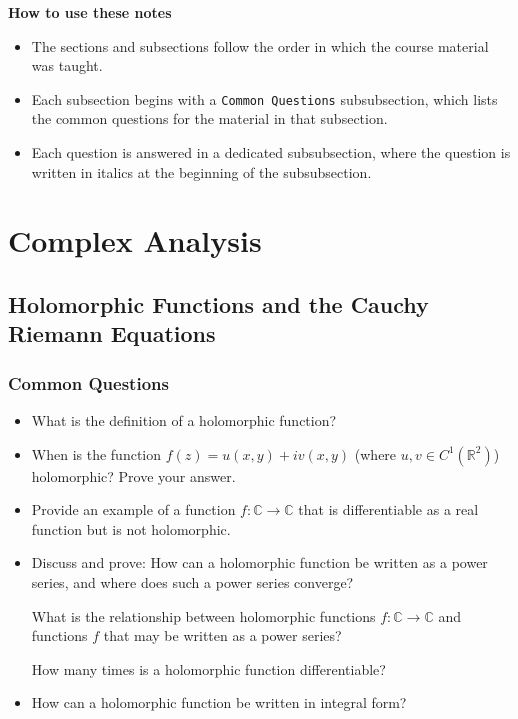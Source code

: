 \documentclass[11pt, a4paper]{article}
\newcommand{\R}{\mathbb{R}} %
\newcommand{\C}{\mathbb{C}} %
\begin{document}
\vspace{5mm}
\textbf{How to use these notes}
\begin{itemize}
    \item The sections and subsections follow the order in which the course material was taught.

    \item Each subsection begins with a \texttt{Common Questions} subsubsection, which lists the common questions for the material in that subsection.

    \item  Each question is answered in a dedicated subsubsection, where the question is written in italics at the beginning of the subsubsection.
\end{itemize}


\newpage

\tableofcontents

\newpage
\pagestyle{headerstyle}
\section{Complex Analysis}

\subsection{Holomorphic Functions and the Cauchy Riemann Equations}

\subsubsection{Common Questions}
\begin{itemize}
	\item What is the definition of a holomorphic function?
	
	\item When is the function $ f(z) = u(x, y) + iv(x, y) $ (where $ u, v \in C^{1}(\R^2)$) holomorphic? Prove your answer. 
	
	\item Provide an example of a function $ f: \C \to \C $ that is differentiable as a real function but is not holomorphic.
	
	\item Discuss and prove: How can a holomorphic function be written as a power series, and where does such a power series converge?
	
	What is the relationship between holomorphic functions $ f:\C \to \C $ and functions $ f $ that may be written as a power series?
	
	How many times is a holomorphic function differentiable? 
	
	 \item How can a holomorphic function be written in integral form? 

\end{itemize}
\end{document}
